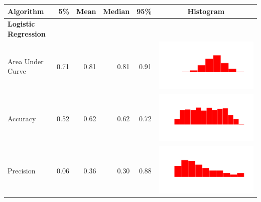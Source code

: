 \begin{table}
  \begin{tabular}{lrrrrc}
    \hline
    \textbf{Algorithm} & \textbf{5\%} & \textbf{Mean} & \textbf{Median} & \textbf{95\%} & \textbf{Histogram} \\
    \hline

    \bf{Logistic Regression}\\
    Area Under Curve & 0.71 & 0.81 & 0.81 & 0.91 & \includegraphics[scale = 0.1, clip = true, trim= 50px 60px 50px 60px]{../figs/hist-results/hist-LRauc.pdf} \\
    Accuracy & 0.52 & 0.62 & 0.62 & 0.72 & \includegraphics[scale = 0.1, clip = true, trim= 50px 60px 50px 60px]{../figs/hist-results/hist-LRacc.pdf} \\
    Precision & 0.06 & 0.36 & 0.30 & 0.88 & \includegraphics[scale = 0.1, clip = true, trim= 50px 60px 50px 60px]{../figs/hist-results/hist-LRprec.pdf} \\

\end{tabular}
\end{table}
